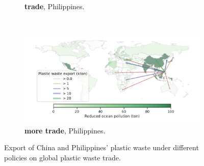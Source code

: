 \documentclass[dvipsnames]{article}
\begin{document}
\begin{figure}
\begin{subfigure}{0.47\textwidth}
    \caption{\textbf{trade}, Philippines.}
\end{subfigure}
~
\begin{subfigure}{0.47\textwidth}
    \centering
    \includegraphics[width=\textwidth]{figures/phl_trade_export_w10.pdf}
    \caption{\textbf{more trade}, Philippines.}
\end{subfigure}
\caption{Export of China and Philippines' plastic waste under different policies on global plastic waste trade.}
\label{fig:trade-graph}
\end{figure}
\end{document}
